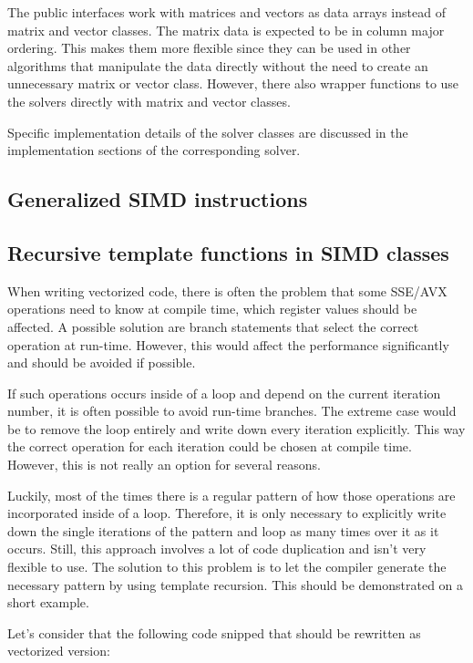 \documentclass[fontsize = 10pt,DIV = 13]{scrartcl}
\begin{document}
The public interfaces work with matrices and vectors as data arrays instead of matrix and vector classes.
The matrix data is expected to be in column major ordering.
This makes them more flexible since they can be used in other algorithms that manipulate the data directly without the need to create an unnecessary matrix or vector class.
However, there also wrapper functions to use the solvers directly with matrix and vector classes.

Specific implementation  details of the solver classes are discussed in the implementation sections of the corresponding solver.


\subsection{Generalized SIMD instructions}

\subsection{Recursive template functions in SIMD classes}
\label{sec:templateRecursion}

When writing vectorized code, there is often the problem that some SSE/AVX operations need to know at compile time, which register values should be affected.
A possible solution are branch statements that select the correct operation at run-time.
However, this would affect the performance significantly and should be avoided if possible.

If such operations occurs inside of a loop and depend on the current iteration number, it is often possible to avoid run-time branches.
The extreme case would be to remove the loop entirely and write down every iteration explicitly.
This way the correct operation for each iteration could be chosen at compile time.
However, this is not really an option for several reasons.

Luckily, most of the times there is a regular pattern of how those operations are incorporated inside of a loop.
Therefore, it is only necessary to explicitly write down the single iterations of the pattern and loop as many times over it as it occurs.
Still, this approach involves a lot of code duplication and isn't very flexible to use.
The solution to this problem is to let the compiler generate the necessary pattern by using template recursion.
This should be demonstrated on a short example.

Let's consider that the following code snipped that should be rewritten as vectorized version:
\end{document}
